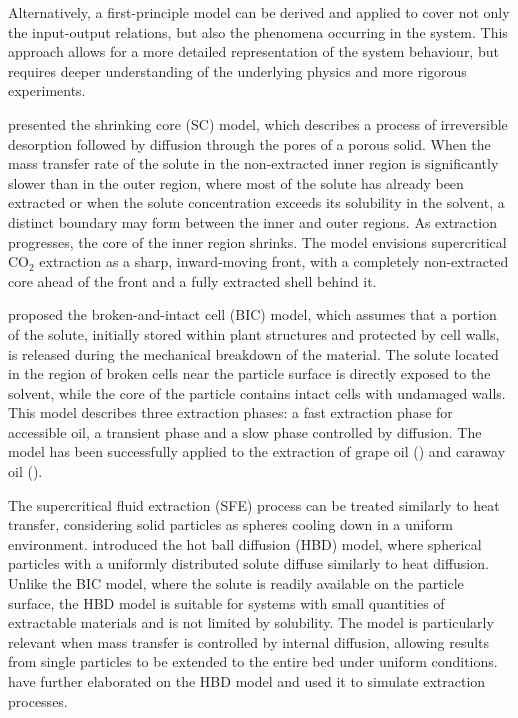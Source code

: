 \documentclass[a4paper,fleqn]{cas-dc}
\begin{document}
Alternatively, a first-principle model can be derived and applied to cover not only the input-output relations, but also the phenomena occurring in the system. This approach allows for a more detailed representation of the system behaviour, but requires deeper understanding of the underlying physics and more rigorous experiments.

\citet{Goto1996} presented the shrinking core (SC) model, which describes a process of irreversible desorption followed by diffusion through the pores of a porous solid. When the mass transfer rate of the solute in the non-extracted inner region is significantly slower than in the outer region, where most of the solute has already been extracted or when the solute concentration exceeds its solubility in the solvent, a distinct boundary may form between the inner and outer regions. As extraction progresses, the core of the inner region shrinks. The model envisions supercritical CO$_2$ extraction as a sharp, inward-moving front, with a completely non-extracted core ahead of the front and a fully extracted shell behind it.

\citet{Sovova1994} proposed the broken-and-intact cell (BIC) model, which assumes that a portion of the solute, initially stored within plant structures and protected by cell walls, is released during the mechanical breakdown of the material. The solute located in the region of broken cells near the particle surface is directly exposed to the solvent, while the core of the particle contains intact cells with undamaged walls. This model describes three extraction phases: a fast extraction phase for accessible oil, a transient phase and a slow phase controlled by diffusion. The model has been successfully applied to the extraction of grape oil (\citet{Sovova1994b}) and caraway oil (\citet{Sovova1994a}).

The supercritical fluid extraction (SFE) process can be treated similarly to heat transfer, considering solid particles as spheres cooling down in a uniform environment. \citet{Bartle1990} introduced the hot ball diffusion (HBD) model, where spherical particles with a uniformly distributed solute diffuse similarly to heat diffusion. Unlike the BIC model, where the solute is readily available on the particle surface, the HBD model is suitable for systems with small quantities of extractable materials and is not limited by solubility. The model is particularly relevant when mass transfer is controlled by internal diffusion, allowing results from single particles to be extended to the entire bed under uniform conditions. \citet{Reverchon1993} have further elaborated on the HBD model and used it to simulate extraction processes.
\end{document}
